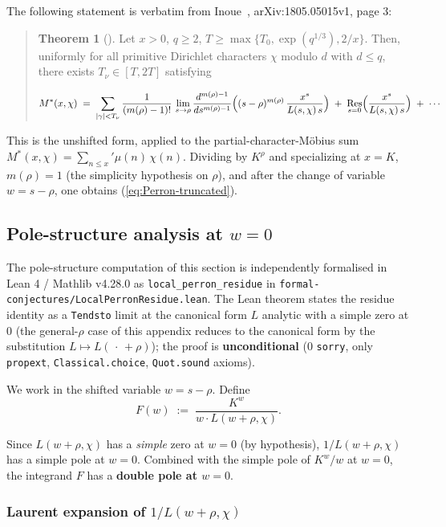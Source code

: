 The following statement is verbatim from Inoue~\cite{Inoue2021}, arXiv:1805.05015v1, page 3:

\begin{quote}
\textbf{Theorem 1} (\cite{Inoue2021}). Let \(x > 0\), \(q \ge 2\),
\(T \ge \max\{T_0, \exp(q^{1/3}), 2/x\}\). Then, uniformly for all
primitive Dirichlet characters \(\chi\) modulo \(d\) with \(d \le q\),
there exists \(T_\nu \in [T, 2T]\) satisfying

\[M^*(x, \chi)
  \;=\; \sum_{|\gamma| < T_\nu} \frac{1}{(m(\rho)-1)!}\,
       \lim_{s \to \rho} \frac{d^{m(\rho)-1}}{ds^{m(\rho)-1}}
       \Bigl((s - \rho)^{m(\rho)}\,\frac{x^s}{L(s, \chi)\,s}\Bigr)
       \;+\; \mathop{\mathrm{Res}}_{s=0}\Bigl(\frac{x^s}{L(s, \chi)\,s}\Bigr)
       \;+\; \cdots\]
\end{quote}

This is the unshifted form, applied to the partial-character-Möbius
sum \(M^*(x, \chi) = \sum_{n \le x}' \mu(n)\,\chi(n)\). Dividing by
\(K^\rho\) and specializing at \(x = K\), \(m(\rho) = 1\) (the simplicity
hypothesis on \(\rho\)), and after the change of variable \(w = s - \rho\),
one obtains (\ref{eq:Perron-truncated}).

\subsection{Pole-structure analysis at \(w = 0\)}

The pole-structure computation of this section is independently
formalised in Lean 4 / Mathlib v4.28.0 as \texttt{local\_perron\_residue} in
\texttt{formal-conjectures/LocalPerronResidue.lean}. The Lean theorem
states the residue identity as a \texttt{Tendsto} limit at the canonical
form \(L\) analytic with a simple zero at \(0\) (the general-\(\rho\) case
of this appendix reduces to the canonical form by the substitution
\(L \mapsto L(\,\cdot\, + \rho)\)); the proof is \textbf{unconditional}
(0 \texttt{sorry}, only \texttt{propext}, \texttt{Classical.choice}, \texttt{Quot.sound}
axioms).

We work in the shifted variable \(w = s - \rho\). Define
\[
F(w) \;:=\; \frac{K^w}{w \cdot L(w + \rho, \chi)}.
\]

Since \(L(w + \rho, \chi)\) has a \emph{simple} zero at \(w = 0\) (by hypothesis),
\(1/L(w+\rho, \chi)\) has a simple pole at \(w = 0\). Combined with the
simple pole of \(K^w / w\) at \(w = 0\), the integrand \(F\) has a
\textbf{double pole at \(w = 0\)}.

\subsubsection{Laurent expansion of \(1/L(w+\rho, \chi)\)}

